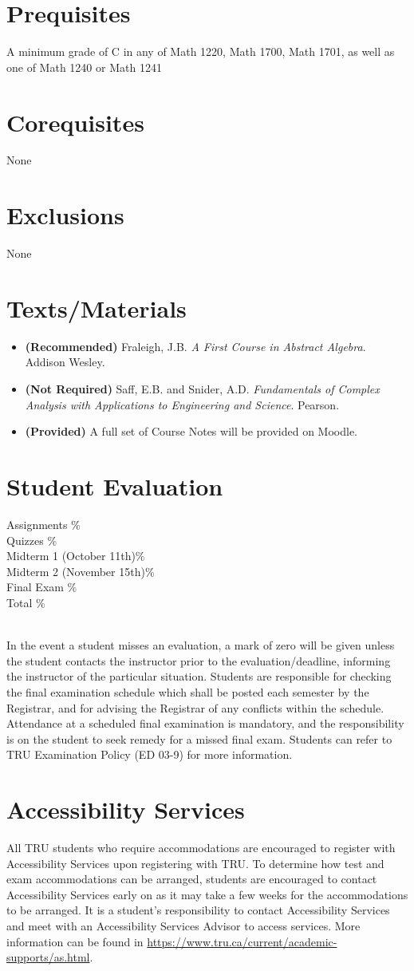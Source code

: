 \documentclass[10pt]{trumathoutline}
\newcommand{\courseprerequisites}{
A minimum grade of C in any of Math 1220, Math 1700, Math 1701, as well as one of Math 1240 or Math 1241}
\newcommand{\coursecorequisites}{None}
\newcommand{\courseexclusions}{None}
\newcommand{\textsmaterials}{
\begin{itemize}
\item \textbf{(Recommended)} Fraleigh, J.B. \emph{A First Course in Abstract Algebra}. Addison Wesley.
\item \textbf{(Not Required)} Saff, E.B. and Snider, A.D. \emph{Fundamentals of Complex Analysis with Applications to Engineering and Science}. Pearson.
\item \textbf{(Provided)} A full set of Course Notes will be provided on Moodle.
\end{itemize}
}
\newcommand{\evaluation}{
	Assignments \dotfill	20\%\\
	Quizzes \dotfill 		15\%\\
	Midterm 1 (October 11th)\dotfill	15\%\\
	Midterm 2 (November 15th)\dotfill 	15\%\\
	Final Exam \dotfill	35\%\\
	Total	\dotfill 		100\%
}
\begin{document}
\section*{Prequisites}
\courseprerequisites

\section*{Corequisites}
\coursecorequisites

\section*{Exclusions}
\courseexclusions

\section*{Texts/Materials}
\textsmaterials

\section*{Student Evaluation}
\begin{minipage}{\textwidth}
\evaluation
\end{minipage}\\


In the event a student misses an evaluation, a mark of zero will be given unless the student contacts the instructor prior to the evaluation/deadline, informing the instructor of the particular situation. Students are responsible for checking the final examination schedule which shall be posted each semester by the Registrar, and for advising the Registrar of any conflicts within the schedule. Attendance at a scheduled final examination is mandatory, and the responsibility is on the student to seek remedy for a missed final exam. Students can refer to TRU Examination Policy (ED 03-9) for more information.


\section*{Accessibility Services}
All TRU students who require accommodations are encouraged to register with Accessibility Services upon registering with TRU. To determine how test and exam accommodations can be arranged, students are encouraged to contact Accessibility Services early on as it may take a few weeks for the accommodations to be arranged. It is a student's responsibility to contact Accessibility Services and meet with an Accessibility Services Advisor to access services. More information can be found in
\href{https://www.tru.ca/current/academic-supports/as.html}{https://www.tru.ca/current/academic-supports/as.html}.
\end{document}

